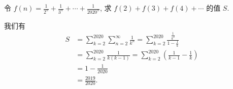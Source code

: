 \begin{prob}
\label{prob:prob-16}
令 $f(n) = \frac{1}{2^n} + \frac{1}{3^n} +\cdots + \frac{1}{2020^n}$,
求 $f(2) + f(3) + f(4) + \cdots$ 的值 $S$.
\end{prob}

\begin{soln}
我们有
\begin{align*}
S &= \sum_{k=2}^{2020}\sum_{n=2}^\infty \frac{1}{k^n}
   = \sum_{k=2}^{2020} \frac{\frac{1}{k^2}}{1-\frac{1}{k}}\\
  &= \sum_{k=2}^{2020}\frac{1}{k(k-1)}
   = \sum_{k=2}^{2020}\left(\frac{1}{k-1} - \frac{1}{k}\right)\\
  &= 1 - \frac{1}{2020}\\
  &= \boxed{\frac{2019}{2020}.}
\end{align*}
\end{soln}

